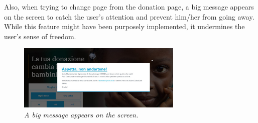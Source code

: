 Also, when trying to change page from the donation page, a big message appears on the screen to catch the user's attention and prevent him/her from going away. While this feature might have been purposely implemented, it undermines the user's sense of freedom.
\begin{figure}[!h]
	\begin{center}
		\includegraphics[width=0.7\textwidth]{FinalScores7.jpg}
		\captionsetup{font=small}
		\caption{\textit{A big message appears on the screen.}}
	\end{center}
\end{figure}







